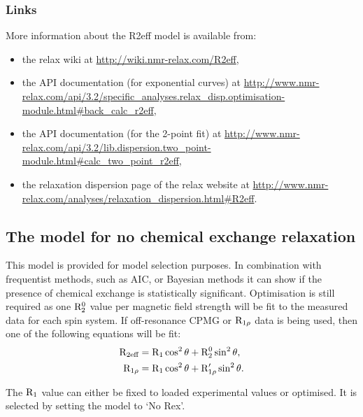 \subsubsection{Links}

More information about the R2eff model is available from:
\begin{itemize}
  \item the relax wiki at \url{http://wiki.nmr-relax.com/R2eff},
  \item the API documentation (for exponential curves) at \url{http://www.nmr-relax.com/api/3.2/specific\_analyses.relax\_disp.optimisation-module.html#back\_calc\_r2eff},
  \item the API documentation (for the 2-point fit) at \url{http://www.nmr-relax.com/api/3.2/lib.dispersion.two\_point-module.html#calc\_two\_point\_r2eff},
  \item the relaxation dispersion page of the relax website at \url{http://www.nmr-relax.com/analyses/relaxation\_dispersion.html#R2eff}.
\end{itemize}



\subsection{The model for no chemical exchange relaxation}
\label{sect: dispersion: No Rex model}

This model is provided for model selection purposes.
In combination with frequentist methods, such as AIC, or Bayesian methods it can show if the presence of chemical exchange is statistically significant.
Optimisation is still required as one $\mathrm{R}_2^0$ value per magnetic field strength will be fit to the measured data for each spin system.
If off-resonance CPMG or $\mathrm{R}_{1\rho}$ data is being used, then one of the following equations will be fit:
\begin{subequations}
\begin{align}
    \mathrm{R}_{\textrm{2eff}} &= \mathrm{R}_1 \cos^2\theta  +  \mathrm{R}_2^0 \sin^2\theta, \\
    \mathrm{R}_{1\rho} &= \mathrm{R}_1 \cos^2\theta  +  \mathrm{R}_{1\rho}' \sin^2\theta.
\end{align}
\end{subequations}

The $\mathrm{R}_1$ value can either be fixed to loaded experimental values or optimised.
It is selected by setting the model to `No Rex'.

